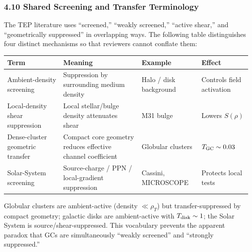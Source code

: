 \documentclass[
]{article}
\newcounter{none} %
\begin{document}
\subsubsection{4.10 Shared Screening and Transfer
Terminology}\label{shared-screening-and-transfer-terminology}

The TEP literature uses ``screened,'' ``weakly screened,'' ``active
shear,'' and ``geometrically suppressed'' in overlapping ways. The
following table distinguishes four distinct mechanisms so that reviewers
cannot conflate them:

{\def\LTcaptype{none} %
\begin{longtable}[]{@{}
  >{\raggedright\arraybackslash}p{}
  >{\raggedright\arraybackslash}p{}
  >{\raggedright\arraybackslash}p{}
  >{\raggedright\arraybackslash}p{}@{}}
\toprule\noalign{}
\begin{minipage}[b]{\linewidth}\raggedright
Term
\end{minipage} & \begin{minipage}[b]{\linewidth}\raggedright
Meaning
\end{minipage} & \begin{minipage}[b]{\linewidth}\raggedright
Example
\end{minipage} & \begin{minipage}[b]{\linewidth}\raggedright
Effect
\end{minipage} \\
\midrule\noalign{}
\endhead
\bottomrule\noalign{}
\endlastfoot
Ambient-density screening & Suppression by surrounding medium density &
Halo / disk background & Controls field activation \\
Local-density shear suppression & Local stellar/bulge density attenuates
shear & M31 bulge & Lowers \(S(\rho)\) \\
Dense-cluster geometric transfer & Compact core geometry reduces
effective channel coefficient & Globular clusters &
\(T_{\rm GC} \sim 0.03\) \\
Solar-System screening & Source-charge / PPN / local-gradient
suppression & Cassini, MICROSCOPE & Protects local tests \\
\end{longtable}
}

Globular clusters are ambient-active (density \(\ll \rho_T\)) but
transfer-suppressed by compact geometry; galactic disks are
ambient-active with \(T_{\rm disk} \sim 1\); the Solar System is
source/shear-suppressed. This vocabulary prevents the apparent paradox
that GCs are simultaneously ``weakly screened'' and ``strongly
suppressed.''
\end{document}
